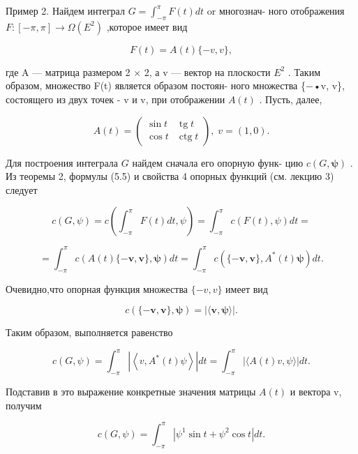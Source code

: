 \documentclass[8pt]{extarticle}
\begin{document}
Пример 2. Найдем интеграл \(G = {\int }_{-\pi }^{\pi }F\left( t\right) {dt}\) or многознач- ного отображения \(F : \left\lbrack  {-\pi ,\pi }\right\rbrack   \rightarrow  \Omega \left( {E}^{2}\right)\) ,которое имеет вид

\[
F\left( t\right)  = A\left( t\right) \{  - v,v\} , \tag{5.5}
\]

где A — матрица размером 2 × 2, а v — вектор на плоскости \({E}^{2}\) . Таким образом, множество F(t) является образом постоян- ного множества \{−•v, v\}, состоящего из двух точек - v и v, при отображении \(A\left( t\right)\) . Пусть, далее,

\[
A\left( t\right)  = \left( \begin{array}{cc} \sin t & \operatorname{tg}t \\  \cos t & \operatorname{ctg}t \end{array}\right) ,\;v = \left( {1,0}\right) .
\]

Для построения интеграла \(G\) найдем сначала его опорную функ- цию \(c\left( {G,\mathbf{\psi }}\right)\) . Из теоремы 2, формулы (5.5) и свойства 4 опорных функций (см. лекцию 3) следует

\[
c\left( {G,\psi }\right)  = c\left( {{\int }_{-\pi }^{\pi }F\left( t\right) {dt},\psi }\right)  = {\int }_{-\pi }^{\pi }c\left( {F\left( t\right) ,\psi }\right) {dt} =
\]

\[
= {\int }_{-\pi }^{\pi }c\left( {A\left( t\right) \{  - \mathbf{v},\mathbf{v}\} ,\mathbf{\psi }}\right) {dt} = {\int }_{-\pi }^{\pi }c\left( {\{  - \mathbf{v},\mathbf{v}\} ,{A}^{ * }\left( t\right) \mathbf{\psi }}\right) {dt}.
\]

Очевидно,что опорная функция множества \(\{  - v,v\}\) имеет вид

\[
c\left( {\{  - \mathbf{v},\mathbf{v}\} ,\mathbf{\psi }}\right)  = \left| {\langle \mathbf{v},\mathbf{\psi }\rangle }\right| .
\]

Таким образом, выполняется равенство

\[
c\left( {G,\psi }\right)  = {\int }_{-\pi }^{\pi }\left| \left\langle  {v,{A}^{ * }\left( t\right) \psi }\right\rangle  \right| {dt} = {\int }_{-\pi }^{\pi }\left| {\langle A\left( t\right) v,\psi \rangle }\right| {dt}.
\]

Подставив в это выражение конкретные значения матрицы \(A\left( t\right)\) и вектора v, получим

\[
c\left( {G,\psi }\right)  = {\int }_{-\pi }^{\pi }\left| {{\psi }^{1}\sin t + {\psi }^{2}\cos t}\right| {dt}.
\]
\end{document}
